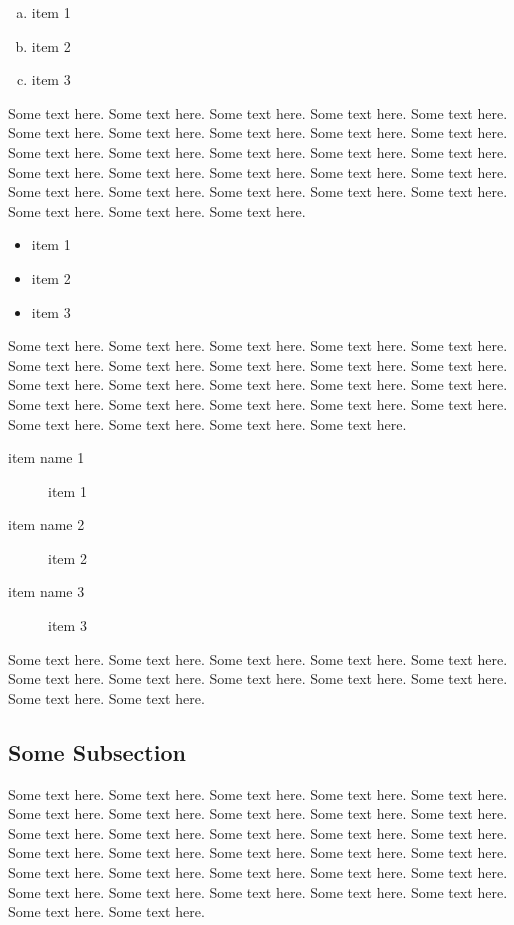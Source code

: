 \documentclass[11pt,twoside]{article}
\theoremstyle{plain}
\theoremstyle{definition}
\theoremstyle{remark}
\begin{document}
\begin{enumerate}[(a)]
  \item item 1
  \item item 2
  \item item 3
\end{enumerate}

Some text here. Some text here. Some text here. Some text here.
Some text here. Some text here. Some text here. Some text here.
Some text here. Some text here. Some text here. Some text here.
Some text here. Some text here. Some text here. Some text here.
Some text here. Some text here. Some text here. Some text here.
Some text here. Some text here. Some text here. Some text here.
Some text here. Some text here. Some text here. Some text here.

\begin{itemize}
  \item item 1
  \item item 2
  \item item 3
\end{itemize}

Some text here. Some text here. Some text here. Some text here.
Some text here. Some text here. Some text here. Some text here.
Some text here. Some text here. Some text here. Some text here.
Some text here. Some text here. Some text here. Some text here.
Some text here. Some text here. Some text here. Some text here.
Some text here. Some text here. Some text here. Some text here.

\begin{description}
  \item[item name 1] item 1
  \item[item name 2] item 2
  \item[item name 3] item 3
\end{description}

Some text here. Some text here. Some text here. Some text here.
Some text here. Some text here. Some text here. Some text here.
Some text here. Some text here. Some text here. Some text here.


\subsection{Some Subsection}
\label{sub:some_subsection}


Some text here. Some text here. Some text here. Some text here.
Some text here. Some text here. Some text here. Some text here.
Some text here. Some text here. Some text here. Some text here.
Some text here. Some text here. Some text here. Some text here.
Some text here. Some text here. Some text here. Some text here.
Some text here. Some text here. Some text here. Some text here.
Some text here. Some text here. Some text here. Some text here.
Some text here. Some text here. Some text here. Some text here.
\end{document}
